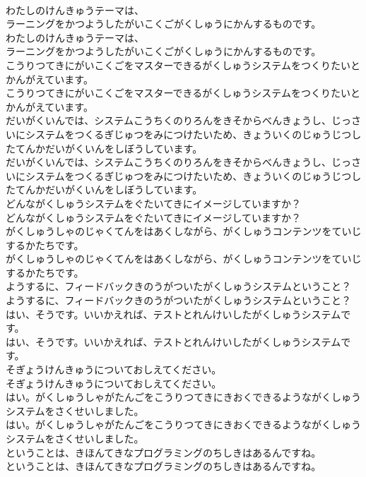 \documentclass[8pt]{extreport}
\begin{document}
\begin{CJK}{UTF8}{min}
\\	わたしのけんきゅうテーマは、
\\	ラーニングをかつようしたがいこくごがくしゅうにかんするものです。
\\	わたしのけんきゅうテーマは、
\\	ラーニングをかつようしたがいこくごがくしゅうにかんするものです。
\\	こうりつてきにがいこくごをマスターできるがくしゅうシステムをつくりたいとかんがえています。
\\	こうりつてきにがいこくごをマスターできるがくしゅうシステムをつくりたいとかんがえています。
\\	だいがくいんでは、システムこうちくのりろんをきそからべんきょうし、じっさいにシステムをつくるぎじゅつをみにつけたいため、きょういくのじゅうじつしたてんかだいがくいんをしぼうしています。
\\	だいがくいんでは、システムこうちくのりろんをきそからべんきょうし、じっさいにシステムをつくるぎじゅつをみにつけたいため、きょういくのじゅうじつしたてんかだいがくいんをしぼうしています。
\\	どんながくしゅうシステムをぐたいてきにイメージしていますか？
\\	どんながくしゅうシステムをぐたいてきにイメージしていますか？
\\	がくしゅうしゃのじゃくてんをはあくしながら、がくしゅうコンテンツをていじするかたちです。
\\	がくしゅうしゃのじゃくてんをはあくしながら、がくしゅうコンテンツをていじするかたちです。
\\	ようするに、フィードバックきのうがついたがくしゅうシステムということ？
\\	ようするに、フィードバックきのうがついたがくしゅうシステムということ？
\\	はい、そうです。いいかえれば、テストとれんけいしたがくしゅうシステムです。
\\	はい、そうです。いいかえれば、テストとれんけいしたがくしゅうシステムです。
\\	そぎょうけんきゅうについておしえてください。
\\	そぎょうけんきゅうについておしえてください。
\\	はい。がくしゅうしゃがたんごをこうりつてきにきおくできるようながくしゅうシステムをさくせいしました。
\\	はい。がくしゅうしゃがたんごをこうりつてきにきおくできるようながくしゅうシステムをさくせいしました。
\\	ということは、きほんてきなプログラミングのちしきはあるんですね。
\\	ということは、きほんてきなプログラミングのちしきはあるんですね。

\end{CJK}
\end{document}
